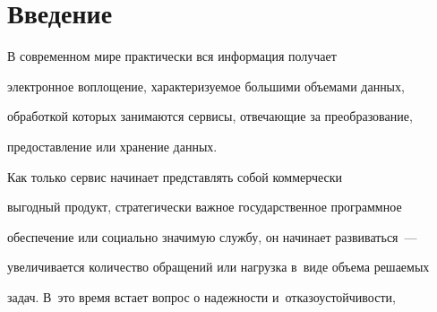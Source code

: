 




























      \thispagestyle{headings}





\section{Введение}


     


     В современном мире практически вся информация получает 


электронное воплощение, характеризуемое большими объемами данных, 


обработкой которых занимаются сервисы, отвечающие за преобразование, 


предоставление или хранение данных.


     


      Как только сервис начинает представлять собой коммерчески 


выгодный продукт, стратегически важное государственное программное 


обеспечение или социально значимую службу, он начинает развиваться~--- 


увеличивается количество обращений или нагрузка в~виде объема решаемых 


задач. В~это время встает вопрос о надежности и~отказоустойчивости, 


